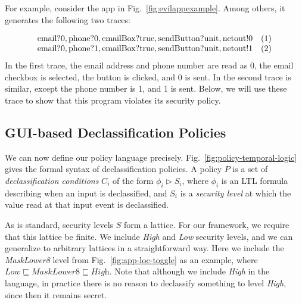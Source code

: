 \documentclass[10pt,conference,compsocconf]{IEEEtran}
\newcommand{\code}[1]{\text{\lstinline!#1!}}
\newcommand{\hyperltltwo}{HyperLTL\xspace}
\begin{document}
For example, consider the app in Fig.~\ref{fig:evilappexample}. Among
others, it generates the following two traces:

\begin{displaymath}
  \begin{array}{cl}
    \code{email}?0, \code{phone}?0, \code{emailBox}?\code{true},
    \code{sendButton}?\code{unit}, \code{netout}!0 & (1) \\
    \code{email}?0, \code{phone}?1, \code{emailBox}?\code{true},
    \code{sendButton}?\code{unit}, \code{netout}!1 & (2) \\
  \end{array}
\end{displaymath}
\lstset{language=Java}
In the first trace, the email address and phone number are read as 0, the
email checkbox is selected, the button is clicked, and 0 is sent. In
the second trace is similar, except the phone number is 1, and 1 is
sent. Below, we will use these trace to show that this program
violates its security policy.

\subsection{GUI-based Declassification Policies}
\label{sec:policies}



We can now define our policy language precisely.
Fig.~\ref{fig:policy-temporal-logic} gives the formal syntax of
declassification policies.  A policy $P$ is a set of
\emph{declassification conditions} $C_i$ of the form $\phi_i\rhd S_i$,
where $\phi_i$ is an LTL formula describing when an input is
declassified, and $S_i$ is a \emph{security level} at which the value
read at that input event is declassified.

As is standard, security levels $S$ form a lattice. 
For our framework, we require that this lattice be finite.
We include
\textit{High} and \textit{Low} security levels, and we can generalize to
arbitrary lattices in a straightforward way. Here we include the
\textit{MaskLower8} level from Fig.~\ref{fig:app-loc-toggle} as an
example, where $\textit{Low} \sqsubseteq \textit{MaskLower8} \sqsubseteq \textit{High}$.
Note that although we include \textit{High} in the language, in practice there
is no reason to declassify something to level \textit{High}, since then it
remains secret.
\end{document}
